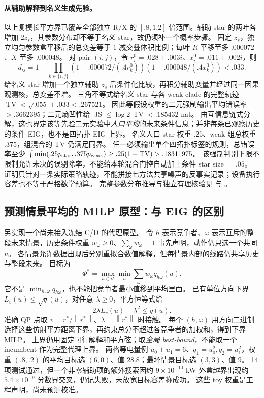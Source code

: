 \documentclass[UTF8,fontset=fandol,11pt,a4paper]{ctexart}
\newcommand{\norm}[1]{\left\lVert#1\right\rVert}
\begin{document}
\paragraph{从辅助解释到名义生成先验。}
以上复模长平方界已覆盖全部独立 R/X 的 $[.8,1.2]$ 倍范围。辅助 star 的两叶各增加 $2z_s$，其参数分布却不等于名义 star，故仍须补一个概率步骤。
固定 $z_s$，独立均匀参数盒平移后的总变差等于 $1$ 减交叠体积比例；每叶 $R$ 平移至多 $.000072$、$X$ 至多 $.000048$。
对 pair $(i,j)$，令 $r_i^0=.028+.003i$、$x_i^0=.011+.002i$，则
\[
 d_{ij}=1-\prod_{k\in\{i,j\}}
 (1-.000072/(.4r_k^0))(1-.000048/(.4x_k^0))<.033.
\]
给名义 star 增加一个独立辅助 $z_s$ 后条件化比较，再积分辅助变量并经过同一因果观测核，总变差不增。
三角不等式给名义 star 与各 weak-clade 的完整轨迹 $\operatorname{TV}<\sqrt{.055}+.033<.267521$。
因此等假设权重的二元强制输出平均错误率 $>.3662395$；二元熵凹性给 $\operatorname{JS}\le\log2\,\operatorname{TV}<.185432$ nat。
由互信息链式分解，这也界定该等先验二元实验中\emph{人口平均}的未来条件信息；并非每条已观察历史的条件 EIG，也不是四拓扑 EIG 上界。
名义人口 star 权重 $.25$、weak 组总权重 $.375$，组混合的 TV 仍满足同界。
任一必须输出单个四拓扑标签的规则，总错误率至少
$\int\min(.25p_{\rm star},.375p_{\rm weak})\ge.25(1-\operatorname{TV})>.18311975$。
该强制判别下限不限制允许未决的误剔除率，不能给本轮混合门控自动加上条件 star size $=.05$。
证明只针对一条实际策略轨迹，不能拼接七方法共享噪声的反事实记录；设备执行容差也不等于严格数学预算。
完整参数分布推导与独立有理核验见  与 。


\subsection{预测情景平均的 MILP 原型：与 EIG 的区别}
另实现一个尚未接入冻结 C/D 的代理原型。
令 $h$ 表示竞争者、$\omega$ 表示互斥的整段未来情景，历史条件权重 $w_\omega\ge0$、$\sum_\omega w_\omega=1$ 事先声明，动作仍只选一个共同 $u$。
各情景允许数据出现后分别重拟合数值解释，但每情景内部的线路仍共享历史与整段未来。
目标为
\begin{equation}
 \Phi^*=\max_{u\in\mathcal U}\min_h\sum_\omega w_\omega q_{h\omega}(u).
 \label{eq:adapt-weighted}
\end{equation}
它不是 $\min_{h,\omega}q_{h\omega}$，也不能把竞争者最小值移到平均里面。
已有单位方向下界 $L_v(u)\le\sqrt q(u)$，对任意 $\lambda\ge0$，平方恒等式给
\[
 2\lambda L_v(u)-\lambda^2\le q(u).
\]
准确 QP 点取 $v=r^*/\norm{r^*}$、$\lambda=\norm{r^*}$ 时接触。
每个 $(h,\omega)$ 用方向二进制选择这些仿射平方距离下界，再约束总分不超过各竞争者的加权和，得到下界 MILP。
上界仍用固定可行解释和平方弦；取\emph{全局 best-bound}，不能取一个 incumbent 作为完整代理上界。
两格等电量例 $u_0+u_1=6$、$q_1=u_0^2,q_2=u_1^2$，权重 $(.8,.2)$ 的平均目标选 $(6,0)$、值 $28.8$；最坏情景目标选 $(3,3)$、值 $9$。
14 项测试通过，但一个非零辅助项的额外搜索因约 $9\times10^{-10}$ kW 外盒越界出现约 $5.4\times10^{-9}$ 分数界交叉，仍记失败，未放宽目标容差称成功。
这些 toy 权重是工程声明，尚未预测校准。
\end{document}
